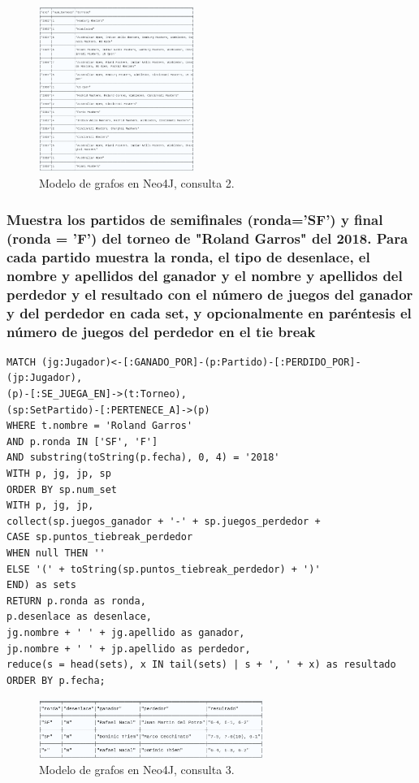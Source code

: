 \begin{figure}[H]
\centering
\includegraphics[width=0.45\textwidth]{fotos/q2_neo.png}
\caption{Modelo de grafos en Neo4J, consulta 2.}
\label{fig:q2_neo}
\end{figure}



\subsubsection{Muestra los partidos de semiﬁnales (ronda='SF') y ﬁnal (ronda = 'F') del torneo de "Roland Garros" del 2018. Para cada partido muestra la ronda, el tipo de desenlace, el nombre y apellidos del ganador y el nombre y apellidos del perdedor y el resultado con el número de juegos del ganador y del perdedor en cada set, y opcionalmente en paréntesis el número de juegos del perdedor en el tie break}

\begin{verbatim}
MATCH (jg:Jugador)<-[:GANADO_POR]-(p:Partido)-[:PERDIDO_POR]-(jp:Jugador),
(p)-[:SE_JUEGA_EN]->(t:Torneo),
(sp:SetPartido)-[:PERTENECE_A]->(p)
WHERE t.nombre = 'Roland Garros'
AND p.ronda IN ['SF', 'F']
AND substring(toString(p.fecha), 0, 4) = '2018'
WITH p, jg, jp, sp
ORDER BY sp.num_set
WITH p, jg, jp,
collect(sp.juegos_ganador + '-' + sp.juegos_perdedor +
CASE sp.puntos_tiebreak_perdedor
WHEN null THEN ''
ELSE '(' + toString(sp.puntos_tiebreak_perdedor) + ')'
END) as sets
RETURN p.ronda as ronda,
p.desenlace as desenlace,
jg.nombre + ' ' + jg.apellido as ganador,
jp.nombre + ' ' + jp.apellido as perdedor,
reduce(s = head(sets), x IN tail(sets) | s + ', ' + x) as resultado
ORDER BY p.fecha;
\end{verbatim}

\begin{figure}[H]
\centering
\includegraphics[width=0.65\textwidth]{fotos/q3_neo.png}
\caption{Modelo de grafos en Neo4J, consulta 3.}
\label{fig:q3_neo}
\end{figure}





